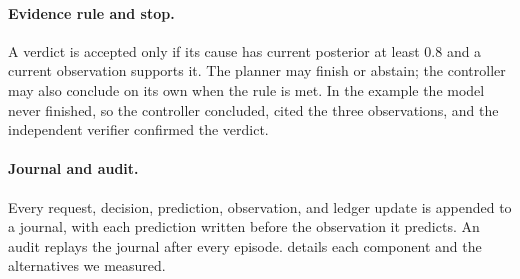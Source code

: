 \paragraph{ Evidence rule and stop.} A verdict is accepted only if its cause has current posterior at least 0.8 and a current observation supports it. The planner may finish or abstain; the controller may also conclude on its own when the rule is met. In the example the model never finished, so the controller concluded, cited the three observations, and the independent verifier confirmed the verdict.

\paragraph{Journal and audit.} Every request, decision, prediction, observation, and ledger update is appended to a journal, with each prediction written before the observation it predicts. An audit replays the journal after every episode.  details each component and the alternatives we measured.
